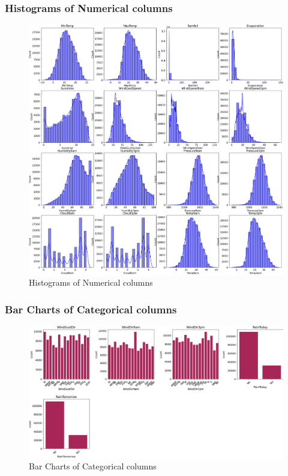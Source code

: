 \documentclass{article}%
\begin{document}
\subsubsection{Histograms of Numerical columns}%
\label{ssubsec:HistogramsofNumericalcolumns}%


\begin{figure}[h!]%
\centering%
\includegraphics[width=460px]{EDA/histograms.png}%
\caption{Histograms of Numerical columns}%
\end{figure}

%
\newpage%
\subsubsection{Bar Charts of Categorical columns}%
\label{ssubsec:BarChartsofCategoricalcolumns}%


\begin{figure}[h!]%
\centering%
\includegraphics[width=460px]{EDA/bar_charts.png}%
\caption{Bar Charts of Categorical columns}%
\end{figure}
\end{document}
